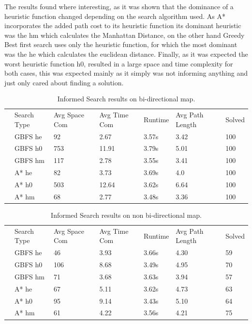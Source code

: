 \documentclass[12pt, letter]{article}
\begin{document}
The results found where interesting, as it was shown that the dominance of a heuristic function changed depending on the search algorithm used. As A* incorporates the added path cost to its heuristic function its dominant heuristic was the hm which calculates the Manhattan Distance, on the other hand Greedy Best first search uses only the heuristic function, for which the most dominant was the he which calculates the euclidean distance. Finally, as it was expected the worst heuristic function h0, resulted in a large space and time complexity for both cases, this was expected mainly as it simply was not informing anything and just only cared about finding a solution.

\begin{table}[htb]
\centering
\caption{Informed Search results on bi-directional map.}
\label{my-label}
\begin{tabular}{lllllll}
 & Search Type & Avg Space Com & Avg Time Com & Runtime & Avg Path Length & Solved \\
 & GBFS he     & 92            & 2.67         & 3.57s   & 3.42            & 100    \\
 & GBFS h0     & 753           & 11.91        & 3.79s   & 5.01            & 100    \\
 & GBFS hm     & 117           & 2.78         & 3.55s   & 3.41            & 100    \\
 & A* he       & 82            & 3.73         & 3.69s   & 4.0             & 100    \\
 & A* h0       & 503           & 12.64        & 3.62s   & 6.64            & 100    \\
 & A* hm       & 68            & 2.77         & 3.48s   & 3.36            & 100   
\end{tabular}
\end{table}

\begin{table}[]
\centering
\caption{Informed Search results on non bi-directional map.}
\label{my-label}
\begin{tabular}{lllllll}
 & Search Type & Avg Space Com & Avg Time Com & Runtime & Avg Path Length & Solved \\
 & GBFS he     & 46            & 3.93         & 3.66s   & 4.30            & 59     \\
 & GBFS h0     & 106           & 8.68         & 3.49s   & 4.95            & 70     \\
 & GBFS hm     & 71            & 3.68         & 3.63s   & 3.94            & 57     \\
 & A* he       & 67            & 5.11         & 3.62s   & 4.73            & 63     \\
 & A* h0       & 95            & 9.14         & 3.43s   & 5.10            & 64     \\
 & A* hm       & 61            & 4.22         & 3.56s   & 4.21            & 75    
\end{tabular}
\end{table}
\end{document}
